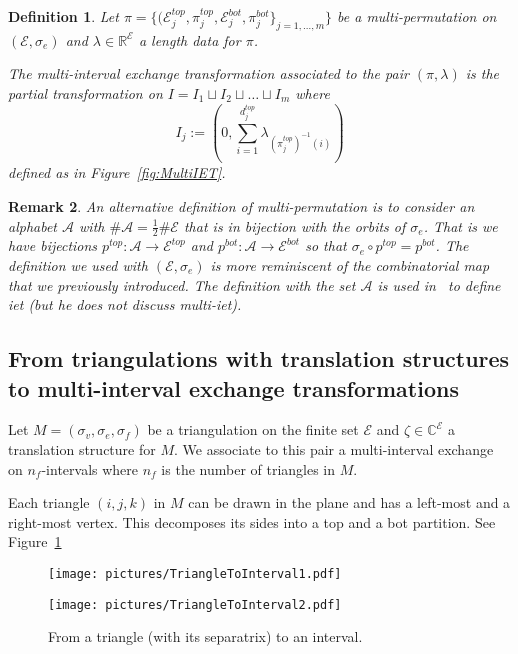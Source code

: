 \documentclass{article}
\def\RR{\mathbb{R}}
\def\CC{\mathbb{C}}
\def\cA{\mathcal{A}}
\def\cE{\mathcal{E}}
\newtheorem{definition}{Definition}
\newtheorem{remark}[definition]{Remark}
\begin{document}
\begin{definition}
Let $\pi = \{(\cE^{top}_j, \pi^{top}_j, \cE^{bot}_j, \pi^{bot}_j\}_{j=1,\ldots,m}\}$
be a multi-permutation on $(\cE, \sigma_e)$ and $\lambda \in \RR^\cE$
a length data for $\pi$.

The \emph{multi-interval exchange transformation} associated to the pair $(\pi,\lambda)$
is the partial transformation on $I = I_1 \sqcup I_2 \sqcup \ldots \sqcup I_m$ where
\[
I_j := \left(0, \sum_{i=1}^{d_j^{top}} \lambda_{(\pi^{top}_j)^{-1}(i)} \right)
\]
defined as in Figure~\ref{fig:MultiIET}.
\end{definition}

\begin{remark}
An alternative definition of multi-permutation is to consider an alphabet $\cA$
with $\# \cA = \frac{1}{2} \# \cE$ that is in bijection with the orbits of
$\sigma_e$. That is we have bijections $p^{top}: \cA \to \cE^{top}$ and
$p^{bot}: \cA \to \cE^{bot}$ so that $\sigma_e \circ p^{top} = p^{bot}$.
The definition we used with $(\cE, \sigma_e)$ is more reminiscent of
the combinatorial map that we previously introduced. The definition with the set
$\cA$ is used in~\cite{Yoccoz} to define iet (but he does not discuss multi-iet).
\end{remark}

\subsection{From triangulations with translation structures to multi-interval exchange transformations}
Let $M = (\sigma_v, \sigma_e, \sigma_f)$ be a triangulation on
the finite set $\cE$ and $\zeta \in \CC^\cE$ a translation structure for $M$.
We associate to this pair a multi-interval exchange on
$n_f$-intervals where $n_f$ is the number of triangles in $M$.

Each triangle $(i,j,k)$ in $M$ can be drawn in the plane and has a left-most and
a right-most vertex. This decomposes its sides into a top and a bot partition.
See Figure~\ref{fig:FromTrianglesToIntervals}
\begin{figure}[!ht]
\begin{minipage}{0.4\textwidth}
\begin{center}
\texttt{[image: pictures/TriangleToInterval1.pdf]}
\end{center}
\end{minipage}
\hspace{.1\textwidth}
\begin{minipage}{0.4\textwidth}
\begin{center}
\texttt{[image: pictures/TriangleToInterval2.pdf]}
\end{center}
\end{minipage}
\caption{From a triangle (with its separatrix) to an interval.}
\label{fig:FromTrianglesToIntervals}
\end{figure}
\end{document}

